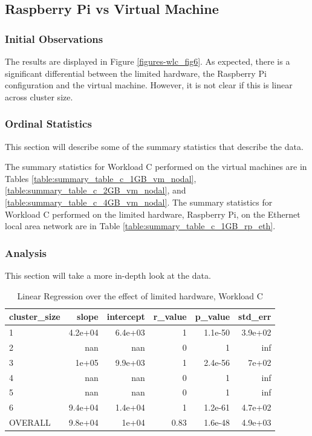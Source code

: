 \subsection{Raspberry Pi vs Virtual Machine}
\subsubsection{Initial Observations}
The results are displayed in Figure \ref{figures-wlc_fig6}.  As expected, there is a significant differential between the limited hardware, the Raspberry Pi configuration and the virtual machine.  However, it is not clear if this is linear across cluster size. 

\subsubsection{Ordinal Statistics}
This section will describe some of the summary statistics that describe the data.  

The summary statistics for Workload C performed on the virtual machines are in Tables \ref{table:summary_table_c_1GB_vm_nodal}, \ref{table:summary_table_c_2GB_vm_nodal}, and \ref{table:summary_table_c_4GB_vm_nodal}.
The summary statistics for Workload C performed on the limited hardware, Raspberry Pi, on the Ethernet local area network are in Table \ref{table:summary_table_c_1GB_rp_eth}.



\subsubsection{Analysis}
This section will take a more in-depth look at the data.




\begin{table}[H]
\centering
\begin{tabular}{lrrrrr}
\toprule
cluster\_size &   slope &  intercept &  r\_value &  p\_value &  std\_err \\
\midrule
           1 & 4.2e+04 &    6.4e+03 &        1 &  1.1e-50 &  3.9e+02 \\
           2 &     nan &        nan &        0 &        1 &      inf \\
           3 &   1e+05 &    9.9e+03 &        1 &  2.4e-56 &    7e+02 \\
           4 &     nan &        nan &        0 &        1 &      inf \\
           5 &     nan &        nan &        0 &        1 &      inf \\
           6 & 9.4e+04 &    1.4e+04 &        1 &  1.2e-61 &  4.7e+02 \\
     OVERALL & 9.8e+04 &      1e+04 &     0.83 &  1.6e-48 &  4.9e+03 \\
\bottomrule
\end{tabular}
\caption{Linear Regression over the effect of limited hardware, Workload C}
\label{table:rp_v_vm_c}
\end{table}





